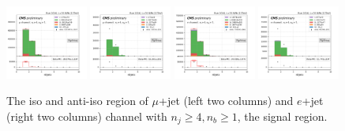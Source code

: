 \begin{figure}
    \includegraphics[width=0.24\textwidth]{chapters/Appendix/sectionQCD/figures/4j1b/mu_nBJets_True_mcqcd.png}
    \includegraphics[width=0.24\textwidth]{chapters/Appendix/sectionQCD/figures/4j1b/mu_nBJets_False.png}
    \includegraphics[width=0.24\textwidth]{chapters/Appendix/sectionQCD/figures/4j1b/e_nBJets_True_mcqcd.png}
    \includegraphics[width=0.24\textwidth]{chapters/Appendix/sectionQCD/figures/4j1b/e_nBJets_False.png}
    

    \caption{The iso and anti-iso region of $\mu$+jet (left two columns) and $e$+jet (right two columns) channel 
    with $n_j\geq4,n_b\geq1$, the signal region.}
    \label{fig:appendix:4j1b}
\end{figure}
\FloatBarrier